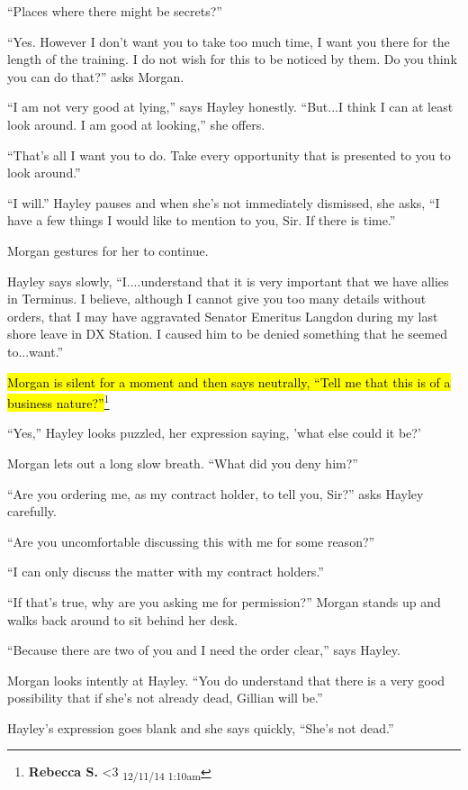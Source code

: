 ``Places where there might be secrets?''

``Yes.  However I don't want you to take too much time, I want you there for the length of the training.  I do not wish for this to be noticed by them.  Do you think you can do that?'' asks Morgan.

``I am not very good at lying,'' says Hayley honestly.  ``But...I think I can at least look around.  I am good at looking,'' she offers.

``That's all I want you to do.  Take every opportunity that is presented to you to look around.''

``I will.''  Hayley pauses and when she's not immediately dismissed, she asks, ``I have a few things I would like to mention to you, Sir.  If there is time.''

Morgan gestures for her to continue.

Hayley says slowly, ``I....understand that it is very important that we have allies in Terminus.  I believe, although I cannot give you too many details without orders, that I may have aggravated Senator Emeritus Langdon during my last shore leave in DX Station.  I caused him to be denied something that he seemed to...want.''

\hl{Morgan is silent for a moment and then says neutrally, ``Tell me that this is of a business nature?''}\footnote{\textbf{Rebecca S. }\textless 3 \textsubscript{12/11/14 1:10am}}

``Yes,'' Hayley looks puzzled, her expression saying, 'what else could it be?'

Morgan lets out a long slow breath.  ``What did you deny him?''

``Are you ordering me, as my contract holder, to tell you, Sir?'' asks Hayley carefully.

``Are you uncomfortable discussing this with me for some reason?''

``I can only discuss the matter with my contract holders.''

``If that's true, why are you asking me for permission?'' Morgan stands up and walks back around to sit behind her desk.

``Because there are two of you and I need the order clear,'' says Hayley.

Morgan looks intently at Hayley.  ``You do understand that there is a very good possibility that if she's not already dead, Gillian will be.''

Hayley's expression goes blank and she says quickly, ``She's not dead.''

